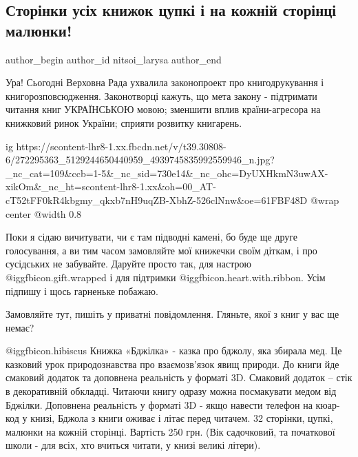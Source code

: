  
 
 
 
 
 
\subsection{Сторінки усіх книжок цупкі і на кожній сторінці малюнки!}
\label{sec:25_01_2022.fb.nitsoi_larysa.1.knigi}
 
\ifcmt
 author_begin
   author_id nitsoi_larysa
 author_end
\fi

Ура! Сьогодні Верховна Рада ухвалила законопроект про книгодрукування і
книгорозповсюдження. Законотворці кажуть, що мета закону - підтримати читання
книг УКРАЇНСЬКОЮ мовою; зменшити вплив країни-агресора на книжковий ринок
України; сприяти розвитку книгарень. 

\ifcmt
  ig https://scontent-lhr8-1.xx.fbcdn.net/v/t39.30808-6/272295363_5129244650440959_4939745835992559946_n.jpg?_nc_cat=109&ccb=1-5&_nc_sid=730e14&_nc_ohc=DyUXHkmN3uwAX-xikOm&_nc_ht=scontent-lhr8-1.xx&oh=00_AT-cT52tFF0kR4kbgmy_qkxb7nH9uqZB-XbhZ-526clNnw&oe=61FBF48D
  @wrap center
  @width 0.8
\fi

Поки я сідаю вичитувати, чи є там підводні камені, бо буде ще друге
голосування, а ви тим часом замовляйте мої книжечки своїм діткам, і про
сусідських не забувайте.  Даруйте просто так, для настрою
@igg{fbicon.gift.wrapped}  і для підтримки @igg{fbicon.heart.with.ribbon}. Усім
підпишу і щось гарненьке побажаю.

Замовляйте тут, пишіть у приватні повідомлення. Гляньте, якої з книг у вас ще
немає?

@igg{fbicon.hibiscus}  Книжка «Бджілка» - казка про бджолу, яка збирала мед.
Це казковий урок природознавства про взаємозв’язок явищ природи. До книги йде
смаковий додаток та доповнена реальність у форматі 3D. Смаковий додаток – стік
в декоративній обкладці. Читаючи книгу одразу можна посмакувати медом від
Бджілки. Доповнена реальність у форматі 3D - якщо навести телефон на кюар-код
у книзі, Бджола з книги оживає і літає перед читачем. 32 сторінки, цупкі,
малюнки на кожній сторінці. Вартість 250 грн. (Вік садочковий, та початкової
школи - для всіх, хто вчиться читати, у книзі великі літери). 

